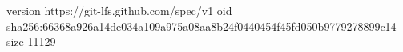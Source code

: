 version https://git-lfs.github.com/spec/v1
oid sha256:66368a926a14de034a109a975a08aa8b24f0440454f45fd050b9779278899c14
size 11129
